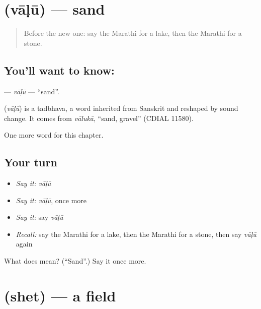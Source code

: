 \section[\texorpdfstring{\mr{वाळू} (vāḷū)}{वाळू (vāḷū)}]{ (vāḷū) — sand}

\label{lesson:MR-C97-valu}



\begin{quote}
Before the new one: say the Marathi for a lake, then the Marathi for a stone.
\end{quote}

\subsection*{You'll want to know: }
\textbf{} — \emph{vāḷū} — \textquotedblleft{}sand\textquotedblright{}.

\begin{cousinweb}
\textbf{} (\emph{vāḷū}) is a tadbhava, a word inherited from Sanskrit and reshaped by sound change. It comes from \emph{vālukā}, \textquotedblleft{}sand, gravel\textquotedblright{} (CDIAL 11580).
\end{cousinweb}

\begin{grammarlens}[title={What you've built}]
One more word for this chapter.
\end{grammarlens}

\subsection*{Your turn}
\begin{itemize}
\raggedright
  \item \emph{Say it:} \emph{vāḷū}
  \item \emph{Say it:} \emph{vāḷū}, once more
  \item \emph{Say it:} say \emph{vāḷū}
  \item \emph{Recall:} say the Marathi for a lake, then the Marathi for a stone, then say \emph{vāḷū} again
\end{itemize}

\begin{tcolorbox}[breakable,colback=teal!4,colframe=teal!35!black,title={Before you move on}]
What does  mean? (\textquotedblleft{}Sand\textquotedblright{}.) Say it once more.
\end{tcolorbox}
\section[\texorpdfstring{\mr{शेत} (shet)}{शेत (shet)}]{ (shet) — a field}

